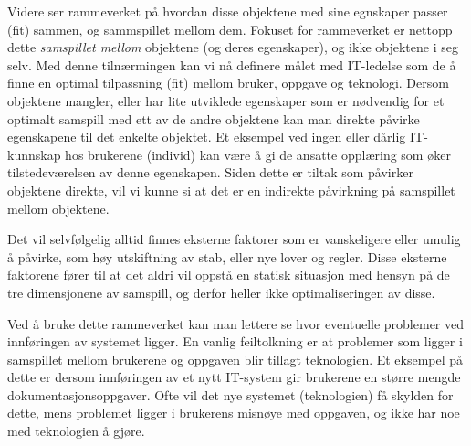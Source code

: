 \noindent
Videre ser rammeverket på hvordan disse objektene med sine egnskaper passer (fit) sammen, og sammspillet mellom dem. Fokuset for rammeverket er nettopp dette \emph{samspillet mellom} objektene (og deres egenskaper), og ikke objektene i seg selv. Med denne tilnærmingen kan vi nå definere målet med IT-ledelse som de å finne en optimal tilpassning (fit) mellom bruker, oppgave og teknologi. Dersom objektene mangler, eller har lite utviklede egenskaper som er nødvendig for et optimalt samspill med ett av de andre objektene kan man direkte påvirke egenskapene til det enkelte objektet. Et eksempel ved ingen eller dårlig IT-kunnskap hos brukerene (individ) kan være å gi de ansatte opplæring som øker tilstedeværelsen av denne egenskapen. Siden dette er tiltak som påvirker objektene direkte, vil vi kunne si at det er en indirekte påvirkning på samspillet mellom objektene.

\noindent
Det vil selvfølgelig alltid finnes eksterne faktorer som er vanskeligere eller umulig å påvirke, som høy utskiftning av stab, eller nye lover og regler. Disse eksterne faktorene fører til at det aldri vil oppstå en statisk situasjon med hensyn på de tre dimensjonene av samspill, og derfor heller ikke optimaliseringen av disse.

\noindent
Ved å bruke dette rammeverket kan man lettere se hvor eventuelle problemer ved innføringen av systemet ligger. En vanlig feiltolkning er at problemer som ligger i samspillet mellom brukerene og oppgaven blir tillagt teknologien. Et eksempel på dette er dersom innføringen av et nytt IT-system gir brukerene en større mengde dokumentasjonsoppgaver. Ofte vil det nye systemet (teknologien) få skylden for dette, mens problemet ligger i brukerens misnøye med oppgaven, og ikke har noe med teknologien å gjøre.

